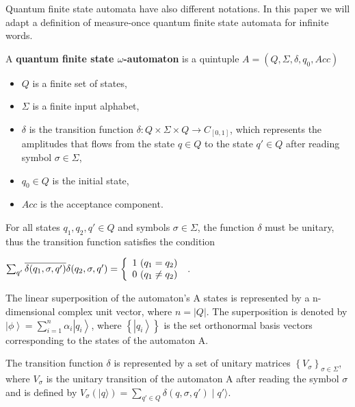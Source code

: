 \documentclass{llncs}
\begin{document}
Quantum finite state automata have also different notations. In this paper we will adapt %
a definition of measure-once quantum finite state automata \cite{Mo97} 
for infinite words.
%
\begin{definition}
A \textbf{quantum finite state $\omega$-automaton} is a quintuple $A=(Q, \Sigma, \delta, q_{0}, Acc)$
\begin{itemize}
\item $Q$ is a finite set of states,
\item $\Sigma$ is a finite input alphabet,
\item $\delta$ is the transition function $\delta : Q \times \Sigma \times Q \rightarrow C_{[0,1]}$, which represents the amplitudes that flows from the state $q \in Q$ to the state $q' \in Q$ after reading symbol $\sigma \in \Sigma$,
\item $q_0 \in Q$ is the initial state,
\item $Acc$ is the acceptance component. 
\end{itemize}
For all states $q_{1}, q_{2}, q' \in Q$ and symbols $\sigma \in \Sigma$, the function $\delta$ must be unitary, thus the transition function satisfies the condition 
\begin{center}
$\sum_{q'}\overline{\delta(q_{1}, \sigma,q')}\delta(q_{2},\sigma, q')=\left\{
\begin{array}[pos]{l}
	1 \ (q_{1} = q_{2}) \\
	0 \ (q_{1} \neq q_{2})
\end{array} \right.\ $.
\end{center}
\end{definition}
%

The linear superposition of the automaton's A states is represented by a n-dimensional complex unit vector, where $n=\left|Q\right|$. The superposition is denoted by $\left|\phi\right\rangle=\sum^{n}_{i=1}\alpha_{i} \left|q_{i}\right\rangle$, where $\left\{\left| q_{i}\right\rangle\right\}$ is the set orthonormal basis vectors corresponding to the states of the automaton A.

The transition function $\delta$ is represented by a set of unitary matrices $\left\{V_{\sigma} \right\}_{\sigma \in \Sigma}$, where $V_{\sigma}$ is the unitary transition of the automaton A after reading the symbol $\sigma$ and is defined by $V_{\sigma}(\mid q \rangle)=\sum_{q'\in Q}\delta(q,\sigma , q')\mid q' \rangle$.
\end{document}
